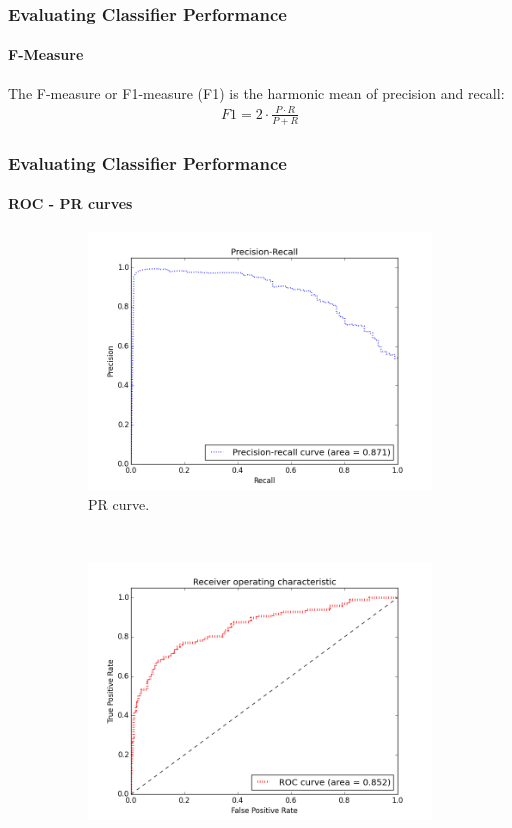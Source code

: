\documentclass{beamer}
\begin{document}
\begin{frame}
    \frametitle{Evaluating Classifier Performance}
    \framesubtitle{F-Measure}
    The F-measure or F1-measure (F1) is the harmonic mean of precision and recall:
    \begin{equation}
    \label{eq:fmes}
    \begin{aligned}
    F1 = 2\cdot \frac{P \cdot R}{P+R}
    \end{aligned}
    \end{equation}
\end{frame}
\begin{frame}
    \frametitle{Evaluating Classifier Performance}
    \framesubtitle{ROC - PR curves}
    \begin{figure}[!htb]
        \centering
        \begin{subfigure}[t]{0.5\textwidth}
            \centering
            \includegraphics[width=\textwidth]{fig/Psv_1_2_fine_PR}
            \caption{PR curve.}
        \end{subfigure}%
        ~
        \begin{subfigure}[t]{0.5\textwidth}
            \centering
            \includegraphics[width=\textwidth]{fig/Psv_1_2_fine_ROC}

\end{subfigure}
\end{figure}
\end{frame}
\end{document}
